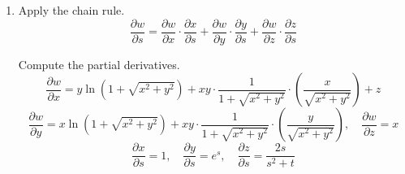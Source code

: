 \documentclass[a4paper, 12pt]{article}
\begin{document}
\begin{enumerate}[leftmargin=*,label=\textbf{\arabic*.}]
Find the cross product.
\begin{align*}\mathbf{n}&=\nabla f\times \nabla g=\left|\begin{array}{ccc}
\mathbf{i}&\mathbf{j}&\mathbf{k}\\
1-2\sqrt2&2\sqrt2&0\\
1&0&2
\end{array}\right|\\[1em]&=\mathbf{i}\left|\begin{array}{cc}
2\sqrt2&0\\0&2
\end{array}\right|-\mathbf{j}\left|\begin{array}{cc}
1-2\sqrt2&0\\1&2
\end{array}\right|+\mathbf{k}\left|\begin{array}{cc}
1-2\sqrt2&2\sqrt2\\1&0
\end{array}\right|\\[1em]&=\left(2\sqrt2\cdot2-0\cdot0\right)\mathbf{i}-\left[\left(1-2\sqrt2\right)\cdot2-0\cdot1\right]\mathbf{j}+\left[\left(1-2\sqrt2\right)\cdot0-2\sqrt2\cdot1\right)\mathbf{k}\\[1em]&=4\sqrt2\,\mathbf{i}+\left(4\sqrt2-2\right)\,\mathbf{j}+-2\sqrt2\,\mathbf{k}\end{align*}

The line of intersection is the normal line of the plane. Therefore, $\mathbf n$ is the normal vector of the plane. The equation of the plane with the normal vector $\mathbf n$ and containing the point $P(x_0,y_0,z_0)$ is
\[n_1(x-x_0)+n_2(y-y_0)+n_3(z-z_0)=0\]

Therefore, the equation for this plane is
\[4\sqrt2(x-0)+\left(4\sqrt2-2\right)(y-1)-2\sqrt2(z-2)=0\]
\[\boxed{2x\sqrt2+y\left(2\sqrt2-1\right)-z\sqrt2+1=0}\]

\item Apply the chain rule.
\[\frac{\partial w}{\partial s}=\frac{\partial w}{\partial x}\cdot\frac{\partial x}{\partial s}+\frac{\partial w}{\partial y}\cdot\frac{\partial y}{\partial s}+\frac{\partial w}{\partial z}\cdot\frac{\partial z}{\partial s}\]

Compute the partial derivatives.
\[\frac{\partial w}{\partial x}=y\ln\left(1+\sqrt{x^2+y^2}\right)+xy\cdot\frac1{1+\sqrt{x^2+y^2}}\cdot\left(\frac{x}{\sqrt{x^2+y^2}}\right)+z\]
\[\frac{\partial w}{\partial y}=x\ln\left(1+\sqrt{x^2+y^2}\right)+xy\cdot\frac1{1+\sqrt{x^2+y^2}}\cdot\left(\frac{y}{\sqrt{x^2+y^2}}\right),\quad \frac{\partial w}{\partial z}=x\]
\[\frac{\partial x}{\partial s}=1,\quad\frac{\partial y}{\partial s}={e}^s,\quad\frac{\partial z}{\partial s}=\frac{2s}{s^2+t}\]


\end{enumerate}
\end{document}
